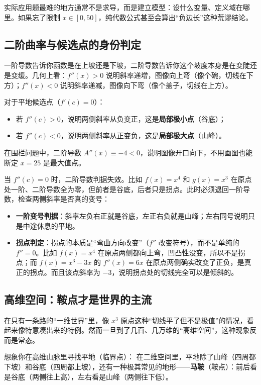 实际应用题最难的地方通常不是求导，而是建立模型：设什么变量、定义域在哪里。如果忘了限制 \(x \in [0, 50]\)，纯代数公式甚至会算出``负边长''这种荒谬结论。

\subsection{二阶曲率与候选点的身份判定}

一阶导数告诉你函数是在上坡还是下坡，二阶导数告诉你这个坡度本身是在变陡还是变缓。几何上看：\(f''(x) > 0\) 说明斜率递增，图像向上弯（像个碗，切线在下方）；\(f''(x) < 0\) 说明斜率递减，图像向下弯（像个盖子，切线在上方）。

对于平地候选点（\(f'(c) = 0\)）：
\begin{itemize}
    \item 若 \(f''(c) > 0\)，说明两侧斜率从负变正，这是\textbf{局部极小点}（谷底）；
    \item 若 \(f''(c) < 0\)，说明两侧斜率从正变负，这是\textbf{局部极大点}（山峰）。
\end{itemize}
在围栏问题中，二阶导数 \(A''(x) \equiv -4 < 0\)，说明图像开口向下，不用画图也能断定 \(x=25\) 是最大值点。

当 \(f''(c) = 0\) 时，二阶导数判据失效。比如 \(f(x) = x^4\) 和 \(g(x) = x^3\) 在原点处一阶、二阶导数全为零，但前者是谷底，后者只是拐点。此时必须退回一阶导数，检查两侧斜率是否真的变号：
\begin{itemize}
    \item \textbf{一阶变号判据}：斜率左负右正就是谷底，左正右负就是山峰；左右同号说明只是中途休息的平地。
    \item \textbf{拐点判定}：拐点的本质是``弯曲方向改变''（\(f''\) 改变符号），而不是单纯的 \(f''=0\)。比如 \(f(x)=x^4\) 在原点两侧都向上弯，凹凸性没变，所以不是拐点；而 \(f(x)=x^3-3x\) 的 \(f''(x)=6x\) 在原点两侧确实改变了正负，是真正的拐点。而且该点斜率为 \(-3\)，说明拐点处的切线完全可以是倾斜的。
\end{itemize}

\subsection{高维空间：鞍点才是世界的主流}

在只有一条路的``一维世界''里，像 \(x^3\) 原点这种``切线平了但不是极值''的情况，看起来像特意凑出来的特例。然而一旦到了几百、几万维的``高维空间''，这种现象反而是常态。

想象你在高维山脉里寻找平地（临界点）：
在二维空间里，平地除了山峰（四周都下坡）和谷底（四周都上坡），还有一种极其常见的地形——\textbf{马鞍}（鞍点）：前后看是谷底（两侧往上高），左右看是山峰（两侧往下低）。


